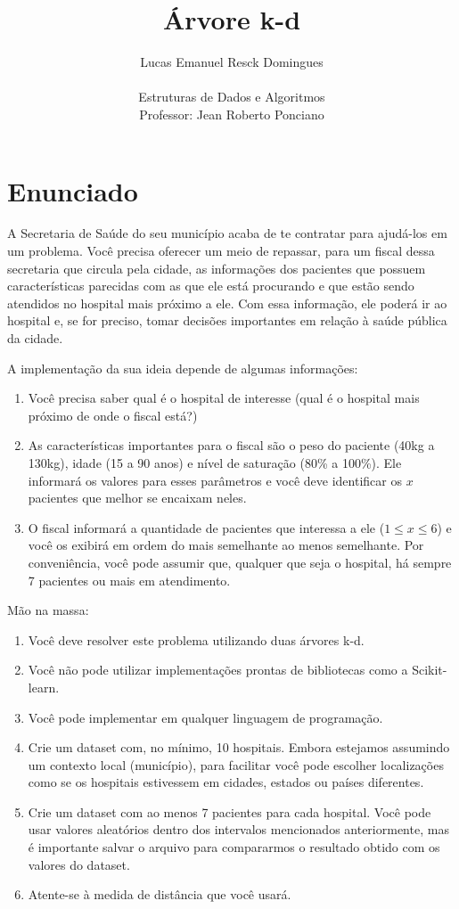 \documentclass{article}
\title{Árvore k-d}
\author{Lucas Emanuel Resck Domingues \\ \\
Estruturas de Dados e Algoritmos \\
Professor: Jean Roberto Ponciano}
\begin{document}
    \maketitle

    \section*{Enunciado}

    A Secretaria de Saúde do seu município acaba de te contratar para ajudá-los em um
    problema. Você precisa oferecer um meio de repassar, para um fiscal dessa secretaria que
    circula pela cidade, as informações dos pacientes que possuem características parecidas
    com as que ele está procurando e que estão sendo atendidos no hospital mais próximo a
    ele. Com essa informação, ele poderá ir ao hospital e, se for preciso, tomar decisões
    importantes em relação à saúde pública da cidade.
    
    A implementação da sua ideia depende de algumas informações:
    \begin{enumerate}
        \item Você precisa saber qual é o hospital de interesse (qual é o hospital mais próximo de onde o fiscal está?)
        \item As características importantes para o fiscal são o peso do paciente (40kg a 130kg), idade (15 a 90 anos) e nível de saturação (80\% a 100\%). Ele informará os valores para esses parâmetros e você deve identificar os $x$ pacientes que melhor se encaixam neles.
        \item O fiscal informará a quantidade de pacientes que interessa a ele ($1 \le x \le 6$) e você os exibirá em ordem do mais semelhante ao menos semelhante. Por conveniência, você pode assumir que, qualquer que seja o hospital, há sempre 7 pacientes ou mais em atendimento.
    \end{enumerate}

    Mão na massa:
    \begin{enumerate}
        \item Você deve resolver este problema utilizando duas árvores k-d.
        \item Você não pode utilizar implementações prontas de bibliotecas como a Scikit-learn.
        \item Você pode implementar em qualquer linguagem de programação.
        \item Crie um dataset com, no mínimo, 10 hospitais. Embora estejamos assumindo um     contexto local (município), para facilitar você pode escolher localizações como se os hospitais estivessem em cidades, estados ou países diferentes.
        \item Crie um dataset com ao menos 7 pacientes para cada hospital. Você pode usar valores aleatórios dentro dos intervalos mencionados anteriormente, mas é importante salvar o arquivo para compararmos o resultado obtido com os valores do dataset.
        \item Atente-se à medida de distância que você usará.
    \end{enumerate}

    \newpage

    

    
\end{document}
